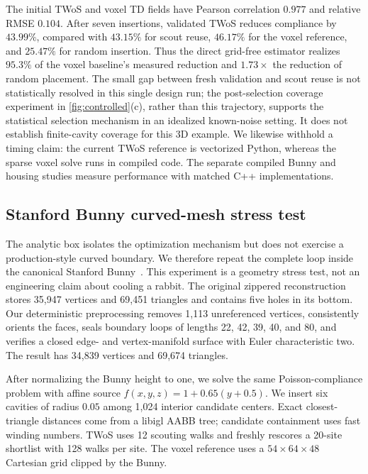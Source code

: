 The initial TWoS and voxel TD fields have Pearson correlation $0.977$ and
relative RMSE $0.104$.  After seven insertions, validated TWoS reduces
compliance by $43.99\%$, compared with $43.15\%$ for scout reuse, $46.17\%$
for the voxel reference, and $25.47\%$ for random insertion.  Thus the direct
grid-free estimator realizes $95.3\%$ of the voxel baseline's measured
reduction and $1.73\times$ the reduction of random placement.  The small gap
between fresh validation and scout reuse is not statistically resolved in this
single design run; the post-selection coverage experiment in
\cref{fig:controlled}(c), rather than this trajectory, supports the statistical selection mechanism in an idealized known-noise setting. It does not establish finite-cavity coverage for this 3D example.  We likewise withhold a timing claim: the current TWoS
reference is vectorized Python, whereas the sparse voxel solve runs in compiled
code.  The separate compiled Bunny and housing studies measure performance with matched C++ implementations.

\subsection{Stanford Bunny curved-mesh stress test}

The analytic box isolates the optimization mechanism but does not exercise a
production-style curved boundary.  We therefore repeat the complete loop
inside the canonical Stanford Bunny~\cite{stanford1994bunny}.  This experiment
is a geometry stress test, not an engineering claim about cooling a rabbit.
The original zippered reconstruction stores 35,947 vertices and 69,451
triangles and contains five holes in its bottom.  Our deterministic
preprocessing removes 1,113 unreferenced vertices, consistently orients the
faces, seals boundary loops of lengths 22, 42, 39, 40, and 80, and verifies a
closed edge- and vertex-manifold surface with Euler characteristic two.  The
result has 34,839 vertices and 69,674 triangles.

After normalizing the Bunny height to one, we solve the same Poisson-compliance
problem with affine source $f(x,y,z)=1+0.65(y+0.5)$.  We insert six cavities of
radius $0.05$ among 1,024 interior candidate centers.  Exact closest-triangle
distances come from a libigl AABB tree; candidate containment uses fast winding
numbers.  TWoS uses 12 scouting walks and freshly rescores a 20-site shortlist
with 128 walks per site.  The voxel reference uses a
$54\times64\times48$ Cartesian grid clipped by the Bunny.

